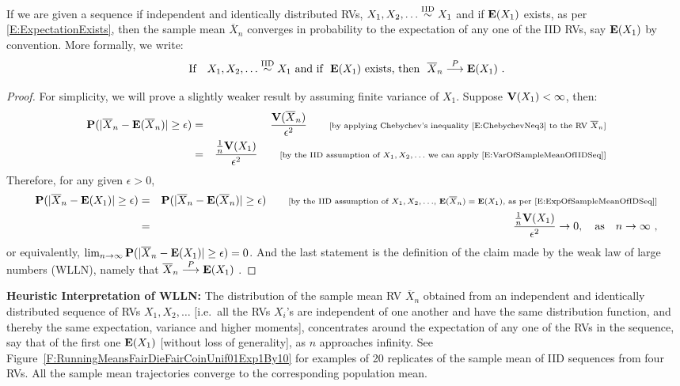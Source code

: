 \begin{prop}
If we are given a sequence if independent and identically distributed RVs, $X_1,X_2,\ldots \overset{{\rm IID}}{\sim} X_1$ and if $\mathbf{E}(X_1)$ exists, as per \eqref{E:ExpectationExists}, then the sample mean $\overline{X}_n$ converges in probability to the expectation of any one of the IID RVs, say $\mathbf{E}(X_1)$ by convention.  More formally, we write:
\[
\text{If} \quad X_1,X_2,\ldots \overset{\IID}{\sim} X_1 \ \text{and if } \ \e(X_1) \ \text{exists, then } \ \overline{X}_n \overset{P}{\longrightarrow} \e(X_1) \ .
\]
{\scriptsize
\begin{proof}
For simplicity, we will prove a slightly weaker result by assuming finite variance of $X_1$.  Suppose $\mathbf{V}(X_1) < \infty$, then:
\begin{eqnarray}
\mathbf{P}(| \overline{X}_n - \mathbf{E}(\overline{X}_n) | \geq \epsilon)
&=& \frac{\mathbf{V}(\overline{X}_n)}{\epsilon^2} \qquad \text{{\scriptsize [by applying Chebychev's inequality \eqref{E:ChebychevNeq3} to the RV $\overline{X}_n$]}} \notag \\
&=& \frac{\frac{1}{n}\mathbf{V}(X_1)}{\epsilon^2} \qquad \text{{\scriptsize [by the IID assumption of $X_1,X_2,\ldots$ we can apply \eqref{E:VarOfSampleMeanOfIIDSeq}]}} \notag 
\end{eqnarray}
Therefore, for any given $\epsilon>0$,
\begin{eqnarray}
\mathbf{P}(| \overline{X}_n - \mathbf{E}(X_1) | \geq \epsilon)
&=&  \mathbf{P}(| \overline{X}_n - \mathbf{E}(\overline{X}_n) | \geq \epsilon) \qquad \text{{\scriptsize [by the IID assumption of $X_1,X_2,\ldots$,  $\mathbf{E}(\overline{X}_n)=\mathbf{E}(X_1)$, as per \eqref{E:ExpOfSampleMeanOfIDSeq}]}} \notag \\
&=&  \frac{\frac{1}{n}\mathbf{V}(X_1)}{\epsilon^2} \to 0, \quad \text{as} \quad n \to \infty \ , \notag
\end{eqnarray}
or equivalently, $\lim_{n \to \infty} \mathbf{P}(| \overline{X}_n - \mathbf{E}(X_1) | \geq \epsilon) = 0$.  And the last statement is the definition of the claim made by the weak law of large numbers (WLLN), namely that $\overline{X}_n \overset{P}{\longrightarrow} \mathbf{E}(X_1)$ .
\end{proof}
}
{\bf Heuristic Interpretation of WLLN:}  
The distribution of the sample mean RV $\overline{X}_n$ obtained from an independent and identically distributed sequence of RVs $X_1,X_2,\ldots$ {\scriptsize [i.e.~all the RVs $X_i$'s are independent of one another and have the same distribution function, and thereby the same expectation, variance and higher moments]}, concentrates around the expectation of any one of the RVs in the sequence, say that of the first one $\mathbf{E}(X_1)$ {\scriptsize [without loss of generality]}, as $n$ approaches infinity.  See Figure~\ref{F:RunningMeansFairDieFairCoinUnif01Exp1By10} for examples of 20 replicates of the sample mean of IID sequences from four RVs.  All the sample mean trajectories converge to the corresponding population mean. 


\end{prop}
